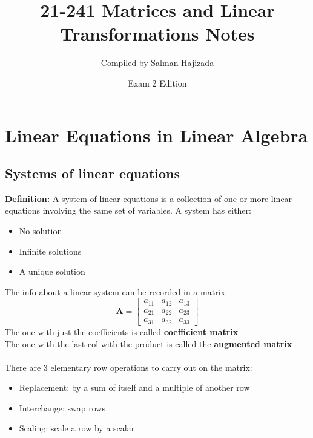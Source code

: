 \documentclass{report}
\title{21-241 Matrices and Linear Transformations Notes}
\date{Exam 2 Edition}
\author{Compiled by Salman Hajizada}
\begin{document}
\maketitle

\chapter{Linear Equations in Linear Algebra}

\section{Systems of linear equations}
\textbf{Definition:} A system of linear equations is a collection of one or more linear equations involving the same set of variables.
A system has either:
\begin{itemize}
    \item No solution
    \item Infinite solutions
    \item A unique solution
\end{itemize}
The info about a linear system can be recorded in a matrix
\[
\mathbf{A} = \begin{bmatrix}
a_{11} & a_{12} & a_{13} \\
a_{21} & a_{22} & a_{23} \\
a_{31} & a_{32} & a_{33}
\end{bmatrix}
\]
The one with just the coefficients is called \textbf{coefficient matrix}
\\The one with the last col with the product is called the \textbf{augmented matrix}
\\\\There are 3 elementary row operations to carry out on the matrix:
\begin{itemize}
    \item Replacement: by a sum of itself and a multiple of another row
    \item Interchange: swap rows
    \item Scaling: scale a row by a scalar
\end{itemize}
\end{document}
